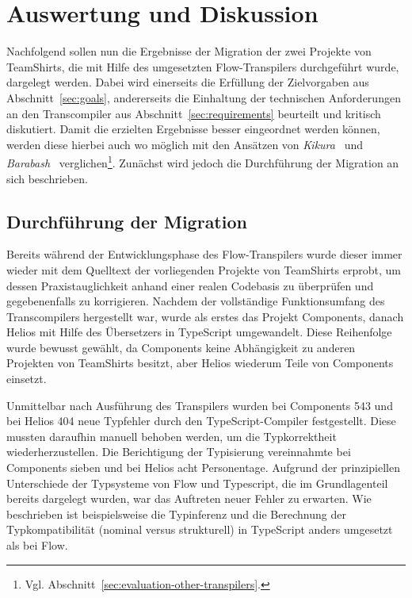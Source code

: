 \chapter{Auswertung und Diskussion}
\label{chap:evaluation}

Nachfolgend sollen nun die Ergebnisse der Migration der zwei Projekte von TeamShirts, die mit Hilfe des umgesetzten Flow-Transpilers durchgeführt wurde, dargelegt werden. Dabei wird einerseits die Erfüllung der Zielvorgaben aus Abschnitt~\ref{sec:goals}, andererseits die Einhaltung der technischen Anforderungen an den Transcompiler aus Abschnitt~\ref{sec:requirements} beurteilt und kritisch diskutiert. Damit die erzielten Ergebnisse besser eingeordnet werden können, werden diese hierbei auch wo möglich mit den Ansätzen von \textit{Kikura}~\autocite{KIKURA:FLOW_TO_TS} und \textit{Barabash}~\autocite{BARABASH:FLOW_TO_TS} verglichen\footnote{Vgl. Abschnitt~\ref{sec:evaluation-other-transpilers}.}. Zunächst wird jedoch die Durchführung der Migration an sich beschrieben.

\section{Durchführung der Migration}

Bereits während der Entwicklungsphase des Flow-Transpilers wurde dieser immer wieder mit dem Quelltext der vorliegenden Projekte von TeamShirts erprobt, um dessen Praxistauglichkeit anhand einer realen Codebasis zu überprüfen und gegebenenfalls zu korrigieren. Nachdem der vollständige Funktionsumfang des Transcompilers hergestellt war, wurde als erstes das Projekt Components, danach Helios mit Hilfe des Übersetzers in TypeScript umgewandelt. Diese Reihenfolge wurde bewusst gewählt, da Components keine Abhängigkeit zu anderen Projekten von TeamShirts besitzt, aber Helios wiederum Teile von Components einsetzt.

Unmittelbar nach Ausführung des Transpilers wurden bei Components 543 und bei Helios 404 neue Typfehler durch den TypeScript-Compiler festgestellt. Diese mussten daraufhin manuell behoben werden, um die Typkorrektheit wiederherzustellen. Die Berichtigung der Typisierung vereinnahmte bei Components sieben und bei Helios acht Personentage. Aufgrund der prinzipiellen Unterschiede der Typsysteme von Flow und Typescript, die im Grundlagenteil bereits dargelegt wurden, war das Auftreten neuer Fehler zu erwarten. Wie beschrieben ist beispielsweise die Typinferenz und die Berechnung der Typkompatibilität (nominal versus strukturell) in TypeScript anders umgesetzt als bei Flow.

